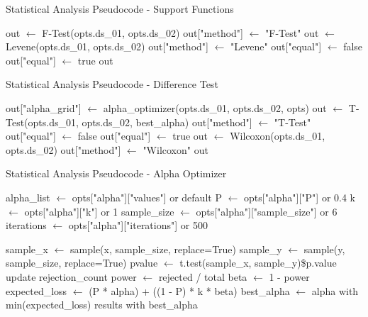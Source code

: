 \documentclass[10pt]{beamer}
\begin{document}
{\begin{frame}{Statistical Analysis Pseudocode - Support Functions}
\begin{algorithmic}[1]
         \State out $\gets$ F-Test(opts.ds\_01, opts.ds\_02)
         \State out["method"] $\gets$ "F-Test"
      \Else
         \State out $\gets$ Levene(opts.ds\_01, opts.ds\_02)
         \State out["method"] $\gets$ "Levene"
      \EndIf
         \State out["equal"] $\gets$ false
      \Else
         \State out["equal"] $\gets$ true
      \EndIf
      \State \Return out
   \EndFunction
   \end{algorithmic}
   \end{frame}

   \begin{frame}{Statistical Analysis Pseudocode - Difference Test}
   \scriptsize
   \begin{algorithmic}[1]
         \State out["alpha\_grid"] $\gets$ alpha\_optimizer(opts.ds\_01, opts.ds\_02, opts)
         \State out $\gets$ T-Test(opts.ds\_01, opts.ds\_02, best\_alpha)
         \State out["method"] $\gets$ "T-Test"
            \State out["equal"] $\gets$ false
         \Else
            \State out["equal"] $\gets$ true
         \EndIf
      \Else
         \State out $\gets$ Wilcoxon(opts.ds\_01, opts.ds\_02)
         \State out["method"] $\gets$ "Wilcoxon"
      \EndIf
      \State \Return out
   \EndFunction
   \end{algorithmic}
   \end{frame}

   \begin{frame}{Statistical Analysis Pseudocode - Alpha Optimizer}
   \scriptsize
   \begin{algorithmic}[1]
      \State alpha\_list $\gets$ opts["alpha"]["values"] or default
      \State P $\gets$ opts["alpha"]["P"] or 0.4
      \State k $\gets$ opts["alpha"]["k"] or 1
      \State sample\_size $\gets$ opts["alpha"]["sample\_size"] or 6
      \State iterations $\gets$ opts["alpha"]["iterations"] or 500
      
            \State sample\_x $\gets$ sample(x, sample\_size, replace=True)
            \State sample\_y $\gets$ sample(y, sample\_size, replace=True)
            \State pvalue $\gets$ t.test(sample\_x, sample\_y)\$p.value
            \State update rejection\_count
         \EndFor
         \State power $\gets$ rejected / total
         \State beta $\gets$ 1 - power
         \State expected\_loss $\gets$ (P * alpha) + ((1 - P) * k * beta)
      \EndFor
      \State best\_alpha $\gets$ alpha with min(expected\_loss)
      \State \Return results with best\_alpha
   \EndFunction
   \end{algorithmic}
   \end{frame}
}
\end{document}
